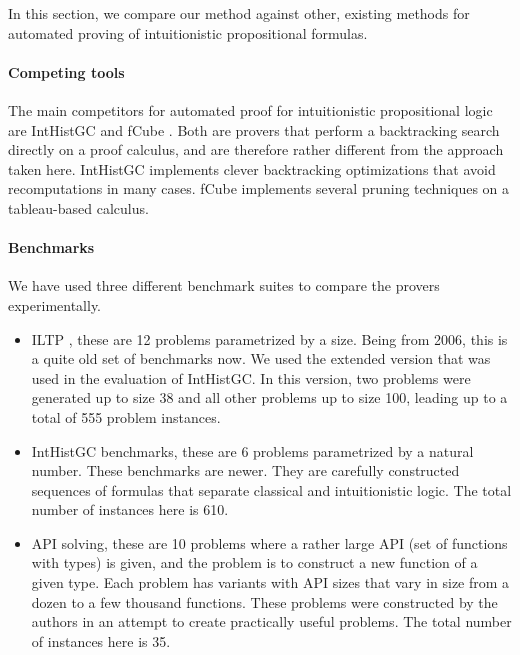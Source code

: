 \documentclass{llncs}
\begin{document}
In this section, we compare our method against other, existing methods for automated proving of intuitionistic propositional formulas.

\paragraph{Competing tools} The main competitors for automated proof for intuitionistic propositional logic are IntHistGC \cite{rajeev} and fCube \cite{fcube}. Both are provers that perform a backtracking search directly on a proof calculus, and are therefore rather different from the approach taken here. IntHistGC implements clever backtracking optimizations that avoid recomputations in many cases. fCube implements several pruning techniques on a tableau-based calculus.

\paragraph{Benchmarks} We have used three different benchmark suites to compare the provers experimentally.

\begin{itemize}

\item ILTP \cite{iltp}, these are 12 problems parametrized by a size. Being from 2006, this is a quite old set of benchmarks now. We used the extended version that was used in the evaluation of IntHistGC. In this version, two problems were generated up to size 38 and all other problems up to size 100, leading up to a total of 555 problem instances.
 
\item IntHistGC benchmarks, these are 6 problems parametrized by a natural number. These benchmarks are newer. They are carefully constructed sequences of formulas that separate classical and intuitionistic logic. The total number of instances here is 610.

\item API solving, these are 10 problems where a rather large API (set of functions with types) is given, and the problem is to construct a new function of a given type. Each problem has variants with API sizes that vary in size from a dozen to a few thousand functions. These problems were constructed by the authors in an attempt to create practically useful problems. The total number of instances here is 35.

\end{itemize}
\end{document}
